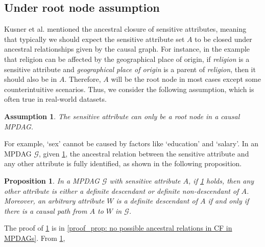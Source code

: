 \documentclass{article}
\newtheorem{proposition}[theorem]{Proposition}
\newtheorem{assumption}[theorem]{Assumption}
\begin{document}
\subsection{Under root node assumption} \label{sec: Counterfactual Fairness in MPDAGs/Under Root Node Assumption}
Kusner et al. \cite[Section 3.2]{kusner2017counterfactual} mentioned the ancestral closure of sensitive attributes, meaning that typically we should expect the sensitive attribute set $A$ to be closed under ancestral relationships given by the causal graph. For instance, in the example that religion can be affected by the geographical place of origin, if \textit{religion} is a sensitive attribute and \textit{geographical place of origin} is a parent of \textit{religion}, then it should also be in $A$. Therefore, $A$ will be the root node in most cases except some counterintuitive scenarios. Thus, we consider the following assumption, which is often true in real-world datasets. 
\begin{assumption} \label{assum: A is a root node}
    The sensitive attribute can only be a root node %
    in a causal MPDAG.
\end{assumption}
For example, `sex' cannot be caused by factors like `education' and `salary'. 
In an MPDAG $\mathcal{G}$, given \cref{assum: A is a root node}, the ancestral relation between the sensitive attribute and any other attribute is fully identified, as shown in the following proposition.
\begin{proposition} \label{prop: no possible ancestral relations in CF in MPDAGs}
In a MPDAG $\mathcal{G}$ with sensitive attribute $A$, if \cref{assum: A is a root node} holds, then any other attribute is either a definite descendant or definite non-descendant of $A$. Moreover, an arbitrary attribute $W$ is a definite descendant of $A$ if and only if there is a causal path from $A$ to $W$ in $\mathcal{G}$. 
\end{proposition}
The proof of \cref{prop: no possible ancestral relations in CF in MPDAGs} is in \cref{proof_prop: no possible ancestral relations in CF in MPDAGs}. From \cref{prop: no possible ancestral relations in CF in MPDAGs}, %
\end{document}
